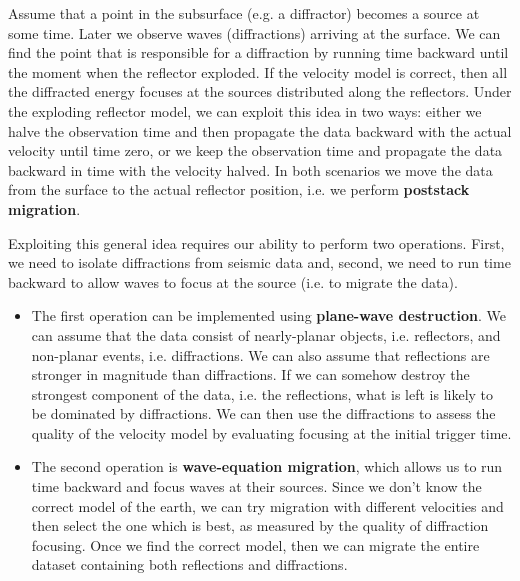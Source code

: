 
Assume that a point in the subsurface (e.g. a diffractor) becomes a
source at some time. Later we observe waves (diffractions) arriving at
the surface. We can find the point that is responsible for a
diffraction by running time backward until the moment when the
reflector exploded. If the velocity model is correct, then all the
diffracted energy focuses at the sources distributed along the
reflectors. Under the exploding reflector model, we can exploit this
idea in two ways: either we halve the observation time and then
propagate the data backward with the actual velocity until time zero,
or we keep the observation time and propagate the data backward in
time with the velocity halved. In both scenarios we move the data from
the surface to the actual reflector position, i.e. we perform
\textbf{poststack migration}.

Exploiting this general idea requires our ability to perform two
operations. First, we need to isolate diffractions from seismic data
and, second, we need to run time backward to allow waves to focus at
the source (i.e. to migrate the data).
\begin{itemize}
\item The first operation can be implemented using \textbf{plane-wave
    destruction}. We can assume that the data consist of nearly-planar
  objects, i.e. reflectors, and non-planar events,
  i.e. diffractions. We can also assume that reflections are stronger
  in magnitude than diffractions. If we can somehow destroy the
  strongest component of the data, i.e. the reflections, what is left
  is likely to be dominated by diffractions. We can then use the
  diffractions to assess the quality of the velocity model by
  evaluating focusing at the initial trigger time.

\item The second operation is \textbf{wave-equation migration}, which
  allows us to run time backward and focus waves at their
  sources. Since we don't know the correct model of the earth, we can
  try migration with different velocities and then select the one
  which is best, as measured by the quality of diffraction
  focusing. Once we find the correct model, then we can migrate the
  entire dataset containing both reflections and diffractions.
\end{itemize}

